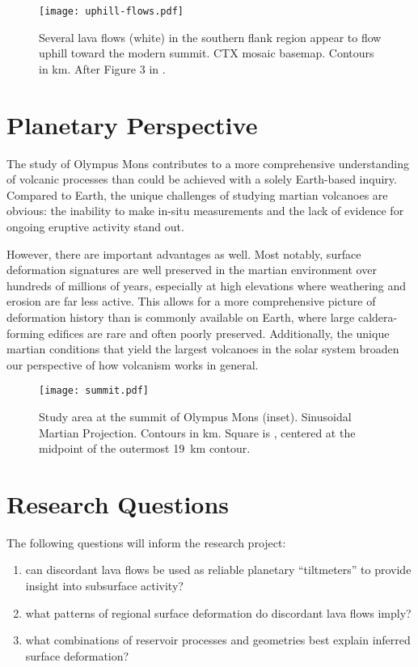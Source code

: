 \begin{figure}
    \centering
    \texttt{[image: uphill-flows.pdf]}
    \caption[Discordant lava flows]{Several lava flows (white) in the southern flank region appear to flow uphill toward the modern summit. \acs{CTX} mosaic basemap. Contours in \unit{\km}. After Figure 3 in \textcite{mouginis-mark_late-stage_2019}.}%
    \label{fig:uphill-flows}
\end{figure}

\section{Planetary Perspective}

The study of Olympus Mons contributes to a more comprehensive understanding of volcanic processes than could be achieved with a solely Earth-based inquiry. Compared to Earth, the unique challenges of studying martian volcanoes are obvious: the inability to make in-situ measurements and the lack of evidence for ongoing eruptive activity stand out. 

However, there are important advantages as well. Most notably, surface deformation signatures are well preserved in the martian environment over hundreds of millions of years, especially at high elevations where weathering and erosion are far less active. This allows for a more comprehensive picture of deformation history than is commonly available on Earth, where large caldera-forming edifices are rare and often poorly preserved. Additionally, the unique martian conditions that yield the largest volcanoes in the solar system broaden our perspective of how volcanism works in general.

\begin{figure}
    \centering
    \texttt{[image: summit.pdf]}
    \caption[Study area: Olympus Mons summit]{Study area at the summit of Olympus Mons (inset). Sinusoidal Martian Projection. Contours in \unit{km}. Square is , centered at the midpoint of the outermost \qty{19}{\km} contour.}\label{fig:summit}
\end{figure}

\section{Research Questions}

The following questions will inform the research project: 
\begin{enumerate}
    \item can discordant lava flows be used as reliable planetary ``tiltmeters'' to provide insight into subsurface activity?
    \item what patterns of regional surface deformation do discordant lava flows imply?
    \item what combinations of reservoir processes and geometries best explain inferred surface deformation?
\end{enumerate}

